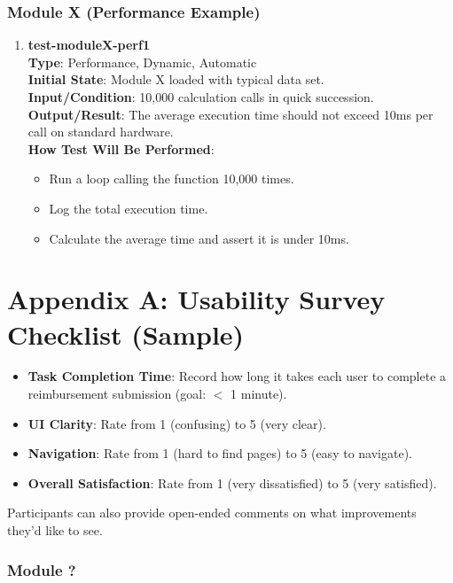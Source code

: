 \documentclass[12pt, titlepage]{article}
\begin{document}
\subsubsection{Module X (Performance Example)}
\begin{enumerate}
    \item \textbf{test-moduleX-perf1} \\
        \textbf{Type}: Performance, Dynamic, Automatic \\
        \textbf{Initial State}: Module X loaded with typical data set. \\
        \textbf{Input/Condition}: 10,000 calculation calls in quick succession. \\
        \textbf{Output/Result}: The average execution time should not exceed 10ms per call on standard hardware. \\
        \textbf{How Test Will Be Performed}:
        \begin{itemize}
            \item Run a loop calling the function 10,000 times.
            \item Log the total execution time.
            \item Calculate the average time and assert it is under 10ms.
        \end{itemize}
\end{enumerate}

\clearpage
\section{Appendix A: Usability Survey Checklist (Sample)}
\begin{itemize}
    \item \textbf{Task Completion Time}: Record how long it takes each user to complete a reimbursement submission (goal: $<$ 1 minute).
    \item \textbf{UI Clarity}: Rate from 1 (confusing) to 5 (very clear).
    \item \textbf{Navigation}: Rate from 1 (hard to find pages) to 5 (easy to navigate).
    \item \textbf{Overall Satisfaction}: Rate from 1 (very dissatisfied) to 5 (very satisfied).
\end{itemize}
Participants can also provide open-ended comments on what improvements they'd like to see.


\subsubsection{Module ?}
\end{document}
